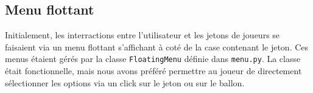 \documentclass[a4paper,12pt]{article}
\begin{document}
\subsection{Menu flottant}
Initialement, les interractions entre l'utilisateur et les jetons de joueurs se faisaient via un menu flottant s'affichant à coté de la case contenant le jeton.
Ces menus étaient gérés par la classe \texttt{FloatingMenu} définie dans \texttt{menu.py}. 
La classe était fonctionnelle, mais nous avons préféré permettre au joueur de directement sélectionner les options via un click sur le jeton ou sur le ballon.
\end{document}
